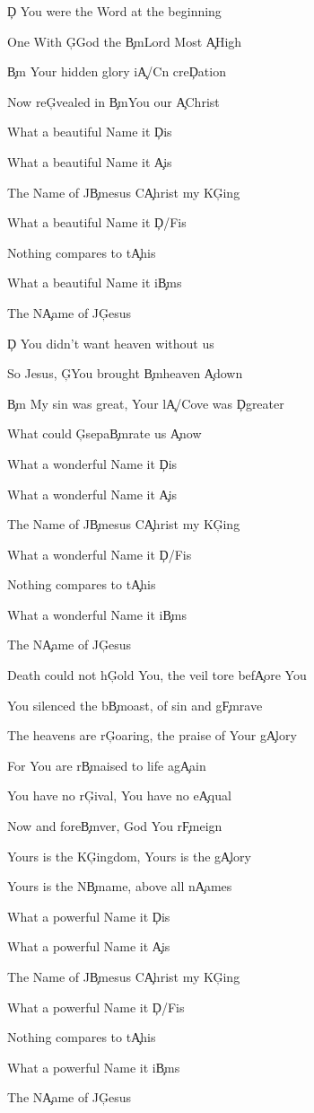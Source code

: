 \documentclass[9pt]{extarticle}
\begin{document}
\bsong

\bv
\c{D} You were the Word at the beginning

One With \c{G}God the \c{Bm}Lord Most \c{A}High

\c{Bm} Your hidden glory i\c{A/C\s }n cre\c{D}ation

Now re\c{G}vealed in \c{Bm}You our \c{A}Christ
\ev

\bc
What a beautiful Name it \c{D}is

What a beautiful Name it \c{A}is

The Name of J\c{Bm}esus C\c{A}hrist my K\c{G}ing

What a beautiful Name it \c{D/F\s }is

Nothing compares to t\c{A}his

What a beautiful Name it i\c{Bm}s

The N\c{A}ame of J\c{G}esus
\ec

\bv
\c{D} You didn't want heaven without us

So Jesus, \c{G}You brought \c{Bm}heaven \c{A}down

\c{Bm} My sin was great, Your l\c{A/C\s }ove was \c{D}greater

What could \c{G}sepa\c{Bm}rate us \c{A}now
\ev

\bc
What a wonderful Name it \c{D}is

What a wonderful Name it \c{A}is

The Name of J\c{Bm}esus C\c{A}hrist my K\c{G}ing

What a wonderful Name it \c{D/F\s }is

Nothing compares to t\c{A}his

What a wonderful Name it i\c{Bm}s

The N\c{A}ame of J\c{G}esus
\ec

\bb
Death could not h\c{G}old You, the veil tore bef\c{A}ore You

You silenced the b\c{Bm}oast, of sin and g\c{F\s m}rave

The heavens are r\c{G}oaring, the praise of Your g\c{A}lory

For You are r\c{Bm}aised to life ag\c{A}ain
\eb

\bb
You have no r\c{G}ival, You have no e\c{A}qual

Now and fore\c{Bm}ver, God You r\c{F\s m}eign

Yours is the K\c{G}ingdom, Yours is the g\c{A}lory

Yours is the N\c{Bm}ame, above all n\c{A}ames
\eb

\bc
What a powerful Name it \c{D}is

What a powerful Name it \c{A}is

The Name of J\c{Bm}esus C\c{A}hrist my K\c{G}ing

What a powerful Name it \c{D/F\s }is

Nothing compares to t\c{A}his

What a powerful Name it i\c{Bm}s

The N\c{A}ame of J\c{G}esus
\ec



\esong
\end{document}
